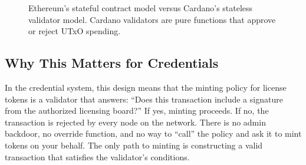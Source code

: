 \begin{figure}[H]
\centering
{}
\caption{Ethereum's stateful contract model versus Cardano's stateless validator model. Cardano validators are pure functions that approve or reject UTxO spending.}
\label{fig:eth-vs-cardano}
\end{figure}

\subsection{Why This Matters for Credentials}

In the credential system, this design means that the minting policy for
license tokens is a validator that answers: ``Does this transaction
include a signature from the authorized licensing board?'' If yes,
minting proceeds. If no, the transaction is rejected by every node on
the network. There is no admin backdoor, no override function, and no
way to ``call'' the policy and ask it to mint tokens on your behalf.
The only path to minting is constructing a valid transaction that
satisfies the validator's conditions.


